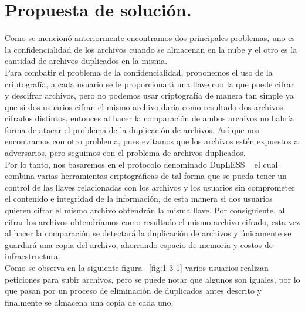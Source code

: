 


\section{Propuesta de solución. }

Como se mencionó anteriormente encontramos dos principales problemas, uno es la confidencialidad de los archivos cuando se almacenan en la nube y el otro es la cantidad de archivos duplicados en la misma. \\

Para combatir el problema de la confidencialidad, proponemos el uso de la criptografía, a cada usuario se le proporcionará una llave con la que puede cifrar y descifrar archivos, pero no podemos usar criptografía de manera tan simple ya que si dos usuarios cifran el mismo archivo daría como resultado dos archivos cifrados distintos, entonces al hacer la comparación de ambos archivos no habría forma de atacar el problema de la duplicación de archivos. Así que nos encontramos con otro problema, pues evitamos que los archivos estén expuestos a adversarios, pero seguimos con el problema de archivos duplicados.\\

 Por lo tanto, nos basaremos en el protocolo denominado DupLESS ~\cite{Bellare} el cual combina varias herramientas criptográficas de tal forma que se pueda tener un control de las llaves relacionadas con los archivos y los usuarios sin comprometer el contenido e integridad de la información, de esta manera si dos usuarios quieren cifrar el mismo archivo obtendrán la misma llave. Por consiguiente, al cifrar los archivos obtendríamos como resultado el mismo archivo cifrado, esta vez al hacer la comparación se detectará la duplicación de archivos y únicamente se guardará una copia del archivo, ahorrando espacio de memoria y costos de infraestructura. \\

Como se observa en la siguiente figura ~\ref{fig:1-3-1} varios usuarios realizan peticiones para subir archivos, pero se puede notar que algunos son iguales, por lo que pasan por un proceso de eliminación de duplicados antes descrito y finalmente se almacena una copia de cada uno. \\




